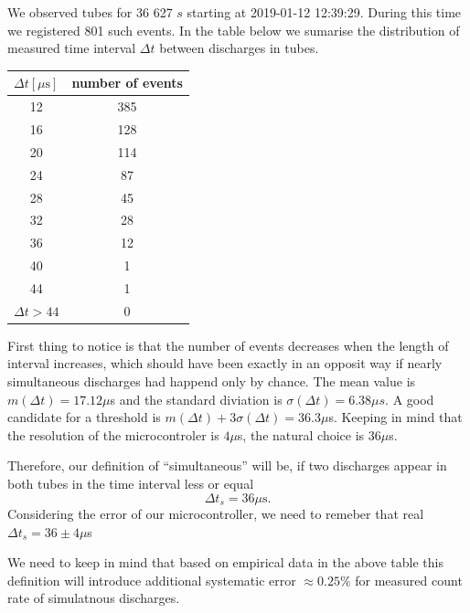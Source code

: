 \documentclass[main.tex]{subfiles}
\begin{document}
We observed tubes for 36 627 $s$ starting at 2019-01-12 12:39:29. During this time we registered 801 such events. In the table below we sumarise the distribution of measured time interval $\Delta t$ between discharges in tubes.
\begin{center}
 \begin{tabular}{||c c||} 
 \hline
 $\Delta t [\mu \text{s}]$ & number of events\\ 
 \hline\hline
 12 & 385\\
 16& 128\\ 20& 114\\ 24& 87\\ 28& 45\\ 32& 28\\ 36& 12\\ 40&1\\ 44&1 \\
 $\Delta t > 44$ & 0 \\
 \hline
\end{tabular}
\end{center}
First thing to notice is that the number of events decreases when the length of interval increases, which should have been exactly in an opposit way if nearly simultaneous discharges had happend only by chance. 
The mean value is $m(\Delta t)=17.12 \mu$s and the standard diviation is $\sigma(\Delta t) = 6.38\mu s$. A good candidate for a threshold is $m(\Delta t) + 3\sigma(\Delta t) = 36.3 \mu$s. Keeping in mind that the resolution of the microcontroler is $4\mu$s, the natural choice is $36\mu$s.

Therefore, our definition of ``simultaneous'' will be, if two discharges appear in both tubes in the time interval less or equal 
\begin{equation}
\Delta t_s = 36 \mu \text{s}.
\end{equation}
Considering the error of our microcontroller, we need to remeber that real $\Delta t_s = 36 \pm 4 \mu$s  

We need to keep in mind that based on empirical data in the above table this definition will introduce additional systematic error $\approx 0.25\%$ for measured count rate of simulatnous discharges.
\end{document}
